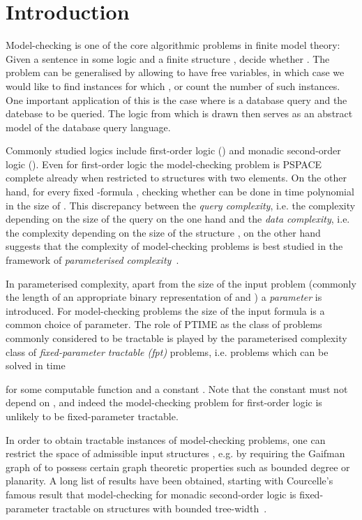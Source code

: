 \documentclass[12pt]{amsart}
\begin{document}
\maketitle



\section{Introduction}
\label{sec:intro}

Model-checking is one of the core algorithmic problems in finite model
theory: Given a sentence  in some logic  and a finite
structure , decide whether . The problem can be
generalised by allowing  to have free variables, in which
case we would like to find instances  for which , or count the number of such
instances. One important application of this is the case where
 is a database query and  the datebase to be queried. The
logic  from which  is drawn then serves as an abstract
model of the database query language.

Commonly studied logics  include first-order logic () and
monadic second-order logic (). Even for first-order logic the
model-checking problem is PSPACE complete already when restricted to
structures  with two elements. On the other hand, for every fixed
-formula , checking whether  can be
done in time polynomial in the size of . This discrepancy between
the \emph{query complexity}, i.e. the complexity depending on the size
of the query  on the one hand and the \emph{data complexity},
i.e. the complexity depending on the size of the structure , on the
other hand suggests that the complexity of model-checking problems is
best studied in the framework of \emph{parameterised
  complexity}~\cite{DowneyF98,FlumG06}.

In parameterised complexity, apart from the size  of the input
problem (commonly the length of an appropriate binary representation
of  and ) a \emph{parameter}  is introduced. For
model-checking problems the size of the input formula is a common
choice of parameter. The role of PTIME as the class of problems
commonly considered to be tractable is played by the parameterised
complexity class of \emph{fixed-parameter tractable (fpt)} problems,
i.e. problems which can be solved in time

for some computable function  and a constant . Note that the
constant  must not depend on , and indeed the model-checking
problem for first-order logic is unlikely to be fixed-parameter
tractable.

In order to obtain tractable instances of model-checking problems, one
can restrict the space of admissible input structures , e.g. by
requiring the Gaifman graph of  to possess certain graph theoretic
properties such as bounded degree or planarity. A long list of results
have been obtained, starting with Courcelle's famous result that
model-checking for monadic second-order logic is fixed-parameter
tractable on structures  with bounded
tree-width~\cite{Courcelle90}.
\end{document}
